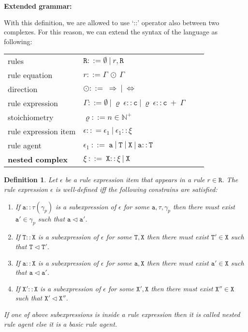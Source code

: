 \documentclass[12pt]{article}
\newtheorem{mydef}{Definition}
\newcommand{\mysmallsection}[1]{\vspace{0.5cm}\large\textbf{#1}\normalsize\vspace{0.5cm}}
\begin{document}
\mysmallsection{Extended grammar:}

With this definition, we are allowed to use `::' operator also between two complexes. For this reason, we can extend the syntax of the language as following:

\begin{center}
{\small
\hspace*{-1cm}\begin{tabular}{ ll ll }
 rules& $\mathtt{R} ::= \emptyset ~|~ r, \mathtt{R} $\\
 rule equation & $r ::= \Gamma ~\odot~\Gamma$\\
 direction & $\odot ::=~ \Rightarrow~|~\Leftrightarrow $\\
 rule expression & $\Gamma ::= \emptyset~|~\varrho~\epsilon::\mathtt{c}~|~ \varrho~\epsilon::\mathtt{c}~ +~\Gamma$\\
 stoichiometry & $\varrho ::= n \in \mathbb{N}^+$\\
 rule expression item & $\epsilon :: = \epsilon_1~|~\epsilon_1::\xi$\\
 rule agent & $\epsilon_1  ~::=~  \mathtt{a}~|~\mathtt{T}~|~\mathtt{X}~|~\mathtt{a}::\mathtt{T}$\\
 \textbf{nested complex} & $\xi  ~::=~  \mathtt{X}::\xi~|~\mathtt{X}$
\end{tabular}
}
\end{center}

\begin{mydef}
Let $\epsilon$ be a rule expression item that appears in a rule $r\in\mathtt{R}$. The \emph{rule expression} $\epsilon$ is \emph{well-defined} iff the following constrains are satisfied:

\begin{enumerate}
 \item If $\mathtt{a}::\tau(\gamma_p)$ is a subexpression of $\epsilon$ for some $\mathtt{a},\tau,\gamma_p$ then there must exist $\mathtt{a}' \in \gamma_p$ such that $\mathtt{a} \lhd \mathtt{a}'$.

\item If $\mathtt{T}::\mathtt{X}$ is a subexpression of $\epsilon$ for some $\mathtt{T},\mathtt{X}$ then there must exist $\mathtt{T}' \in \mathtt{X}$ such that $\mathtt{T} \lhd \mathtt{T}'$.

\item If $\mathtt{a}::\mathtt{X}$ is a subexpression of $\epsilon$ for some $\mathtt{a},\mathtt{X}$ then there must exist $\mathtt{a}' \in \mathtt{X}$ such that $\mathtt{a} \lhd \mathtt{a}'$.

\item If $\mathtt{X}'::\mathtt{X}$ is a subexpression of $\epsilon$ for some $\mathtt{X}',\mathtt{X}$ then there must exist $\mathtt{X}'' \in \mathtt{X}$ such that $\mathtt{X}' \lhd \mathtt{X}''$.

\end{enumerate}
 
If one of above subexpressions is inside a rule expression then it is called \emph{nested} rule agent else it is a \emph{basic} rule agent.
\end{mydef}
\end{document}
